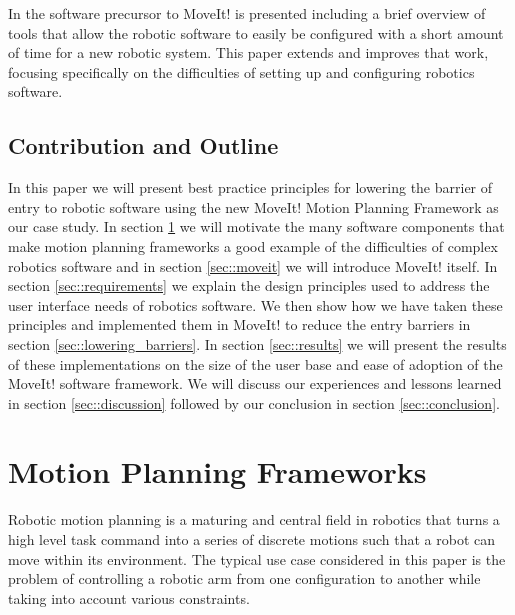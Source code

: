 \documentclass[10pt,journal,compsoc]{joser1}
\begin{document}
{In \cite{chitta2012perception} the software precursor to MoveIt! is presented including a brief overview of tools that allow the robotic software to easily be configured with a short amount of time for a new robotic system. This paper extends and improves that work, focusing specifically on the difficulties of setting up and configuring robotics software.

\subsection{Contribution and Outline}

In this paper we will present best practice principles for lowering the barrier of entry to robotic software using the new MoveIt! Motion Planning Framework as our case study. In section \ref{sec::motion_planning} we will motivate the many software components that make motion planning frameworks a good example of the difficulties of complex robotics software and in section \ref{sec::moveit} we will introduce MoveIt! itself. In section \ref{sec::requirements} we explain the design principles used to address the user interface needs of robotics software. We then show how we have taken these principles and implemented them in MoveIt! to reduce the entry barriers in section \ref{sec::lowering_barriers}. In section \ref{sec::results} we will present the results of these implementations on the size of the user base and ease of adoption of the MoveIt! software framework. We will discuss our experiences and lessons learned in section \ref{sec::discussion} followed by our conclusion in section \ref{sec::conclusion}.

\section{Motion Planning Frameworks}
\label{sec::motion_planning}

Robotic motion planning is a maturing and central field in robotics \cite{moll2011teaching} that turns a high level task command into a series of discrete motions such that a robot can move within its environment. The typical use case considered in this paper is the problem of controlling a robotic arm from one configuration to another while taking into account various constraints.

}
\end{document}
